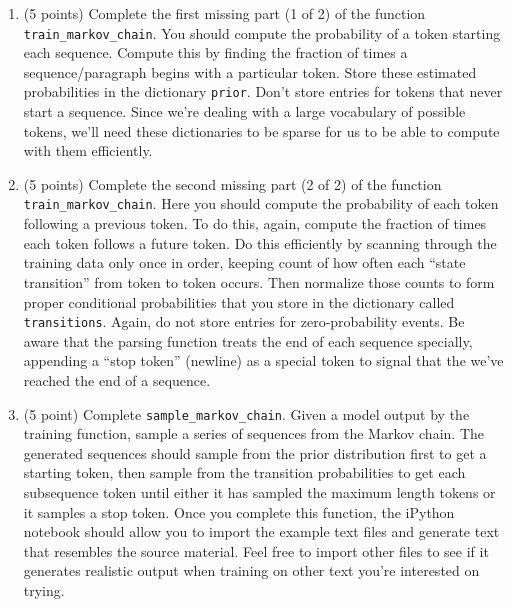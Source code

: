 \documentclass[10pt]{article}
\begin{document}
\begin{enumerate}

\item (5 points) Complete the first missing part (1 of 2) of the function \texttt{train\_markov\_chain}. You should compute the probability of a token starting each sequence. Compute this by finding the fraction of times a sequence/paragraph begins with a particular token. Store these estimated probabilities in the dictionary \texttt{prior}. Don't store entries for tokens that never start a sequence. Since we're dealing with a large vocabulary of possible tokens, we'll need these dictionaries to be sparse for us to be able to compute with them efficiently.

\item (5 points) Complete the second missing part (2 of 2) of the function \texttt{train\_markov\_chain}. Here you should compute the probability of each token following a previous token. To do this, again, compute the fraction of times each token follows a future token. Do this efficiently by scanning through the training data only once in order, keeping count of how often each ``state transition'' from token to token occurs. Then normalize those counts to form proper conditional probabilities that you store in the dictionary called \texttt{transitions}. Again, do not store entries for zero-probability events. Be aware that the parsing function treats the end of each sequence specially, appending a ``stop token'' (newline) as a special token to signal that the we've reached the end of a sequence.

\item (5 point) Complete \texttt{sample\_markov\_chain}. Given a model output by the training function, sample a series of sequences from the Markov chain. The generated sequences should sample from the prior distribution first to get a starting token, then sample from the transition probabilities to get each subsequence token until either it has sampled the maximum length tokens or it samples a stop token. Once you complete this function, the iPython notebook should allow you to import the example text files and generate text that resembles the source material. Feel free to import other files to see if it generates realistic output when training on other text you're interested on trying.

\end{enumerate}
\end{document}
